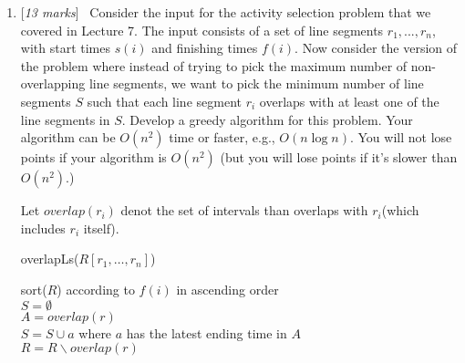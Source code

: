 \documentclass[11pt]{article}
\newcommand{\Q}[1]{\medskip\item {[{\em #1 marks\/}]}\ }
\begin{document}
\begin{enumerate}
\begin{enumerate}
\Q{8} Now suppose that $S=[y_1, ..., y_n]$ is a hypothetical optimal solution, so $0 \le y_i < f_i$, for $i \ge 2$, but for the purpose of contradiction, $S \neq S_g$. Let $i^*$ be the {\em highest} index (so the smallest denomination) where $S_g$ and $S$ differ. Derive a contradiction that $S$ is optimal. This completes the proof that $S_g$ is the optimal solution.

Let $K = \{i: x_i \neq y_i\}$. Since $d_i$ is divisible by $d_{i + 1}$ and $d_{i^*}$ is smallest in $K$, 
$d_k = c_k d_i$ for all $k \in K$. \\
Also $\sum_{i = 1}^{n} y_i d_i  = \sum_{i = 1}^{n} x_i d_i$, $\sum_{k \in K} (x_k - y_k) d_k = 0$ \\
\begin{align*}
    (x_{i^*} - y_{i^*}) d_{i^*} + \sum_{k \in K \backslash \{i^*\}} (x_k - y_k) d_k & = 0 \\
    (x_{i^*} - y_{i^*}) d_{i^*} & = - d_{i^* - 1} \sum_{k \in K \backslash \{i^*\}} c_k(x_k - y_k)\\
    \lvert x_{i^*} - y_{i^*} \rvert & = f_{i^*} \sum_{k \in K \backslash \{i^*\}} \lvert c_k(x_k - y_k) \rvert\\
    \lvert x_{i^*} - y_{i^*} \rvert & > f_{i^*} \text{\quad since } c_k > 1, |x_k - y_k| > 1  
\end{align*}
However, $y_{i^*} < f_{i^*}$ and $x_{i^*} < f_{i^*}$, $\lvert x_{i^*} - y_{i^*} \rvert < f_{i^*}$, a contradiction.

\end{enumerate}


\newpage
\Q{13} Consider the input for the activity selection problem that we covered in Lecture 7. The input consists of a set of line segments $r_1, ..., r_n$, with start times $s(i)$ and finishing times $f(i)$. Now consider the version of the problem where instead of trying to pick the maximum number of non-overlapping line segments, we want to pick the minimum number of line segments $S$ such that each line segment $r_i$ overlaps with at least one of the line segments in $S$. Develop a greedy algorithm for this problem. Your algorithm can be $O(n^2)$ time or faster, e.g., $O(n\log n)$. You will not lose points if your algorithm is $O(n^2)$ (but you will lose points if it's slower than $O(n^2)$.)

Let $overlap(r_i)$ denot the set of intervals than overlaps with $r_i$(which includes $r_i$ itself).

\begin{algorithm} [h]
    \caption{overlapLs($R[r_1, \dots, r_n]$)}
    sort($R$) according to $f(i)$ in ascending order\\
    $S = \emptyset$\\
     {
        $A = overlap(r)$\\
        $S = S \cup {a}$ where $a$ has the latest ending time in $A$\\
        $R = R \backslash overlap(r)$
    }
     {
    } 
\end{algorithm}


\end{enumerate}
\end{document}
